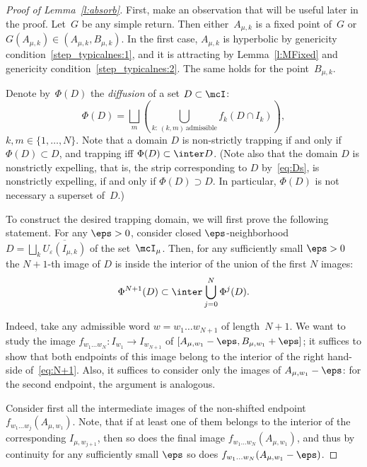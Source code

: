 \documentclass[a4paper,12pt]{amsart}
\begin{document}
\begin{proof}[Proof of Lemma~\ref{l:absorb}]
First, make an observation that will be useful later in the proof.
Let~$G$ be any simple return. Then either~$A_{\mu,k}$ is a fixed point of~$G$ or $G(A_{\mu,k}) \in (A_{\mu,k}, B_{\mu,k})$. In the first case, $A_{\mu,k}$ is hyperbolic by genericity condition~\ref{step_typicalnes:1}, and it is attracting by Lemma~\ref{l:MFixed} and genericity condition~\ref{step_typicalnes:2}.
The same holds for the point~$B_{\mu,k}$.

Denote by~$\Phi(D)$ the \emph{diffusion} of a set $D \subset \mcI$:
$$
\Phi(D)= \bigsqcup_{m} \left(\bigcup_{k: \, (k,m) \, \text{admissible}} f_k(D\cap I_{k})\right),
$$
$k,m \in \{1, \dots, N\}$.
Note that a domain $D$ is non-strictly trapping if and only if $\Phi(D)\subset D$, and trapping iff $\Phi(D)\subset \inter D$. (Note also that the domain $D$ is nonstrictly expelling, that is, the strip corresponding to $D$ by~\eqref{eq:Ds}, is nonstrictly expelling, if and only if $\Phi(D)\supset D$. In particular, $\Phi(D)$ is not necessary a superset of~$D$.)

To construct the desired trapping domain, we will first prove the following statement. For any $\eps>0$,
consider closed $\eps$-neighborhood~$D=\bigsqcup_k \overline{U_{\varepsilon} (I_{\mu, k})}$ of the set~$\mcI_\mu$. Then, for any sufficiently small $\eps>0$ the $N+1$-th image of $D$ is inside the interior of the union of the first $N$ images:
\begin{equation}\label{eq:N+1}
\Phi^{N+1}(D) \subset \inter \bigcup_{j=0}^N \Phi^j(D).
\end{equation}

Indeed, take any admissible word $w=w_1\dots w_{N+1}$ of length~$N+1$. We want to study the image $f_{w_1\dots w_N}:I_{w_1}\to I_{w_{N+1}}$ of $[A_{\mu,w_1}-\eps,B_{\mu,w_1}+\eps]$; it suffices to show that both endpoints of this image belong to the interior of the right hand-side of~\eqref{eq:N+1}. Also, it suffices to consider only the images of $A_{\mu,w_1}-\eps$: for the second endpoint, the argument is analogous.

Consider first all the intermediate images of the non-shifted endpoint $f_{w_1\dots w_j}(A_{\mu,w_1})$. Note, that if at least one of them belongs to the interior of the corresponding $I_{\mu, w_{j+1}}$, then so does the final image $f_{w_1\dots w_N}(A_{\mu,w_1})$, and thus by continuity for any sufficiently small $\eps$ so does $f_{w_1\dots w_N}(A_{\mu,w_1}-\eps)$.


\end{proof}
\end{document}
